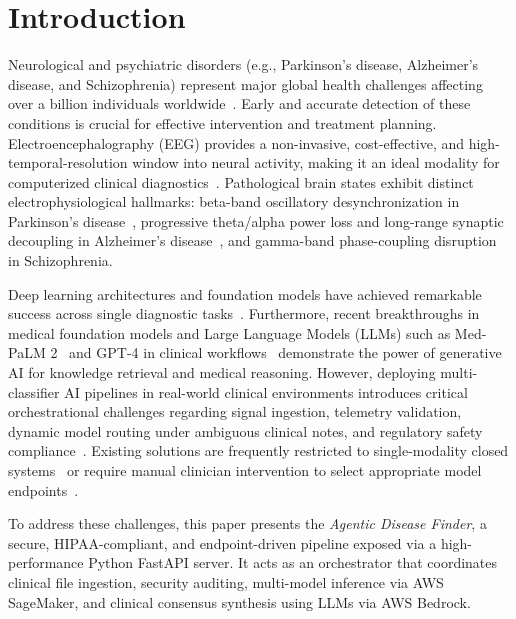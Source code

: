 \documentclass[runningheads]{llncs}
\begin{document}
\section{Introduction}
Neurological and psychiatric disorders (e.g., Parkinson's disease, Alzheimer's disease, and Schizophrenia) represent major global health challenges affecting over a billion individuals worldwide~\cite{who,aan}. Early and accurate detection of these conditions is crucial for effective intervention and treatment planning. Electroencephalography (EEG) provides a non-invasive, cost-effective, and high-temporal-resolution window into neural activity, making it an ideal modality for computerized clinical diagnostics~\cite{craik2019deep,acharya2019eeg}. Pathological brain states exhibit distinct electrophysiological hallmarks: beta-band oscillatory desynchronization in Parkinson's disease~\cite{hammond2007pathological}, progressive theta/alpha power loss and long-range synaptic decoupling in Alzheimer's disease~\cite{song2023eegtransformer}, and gamma-band phase-coupling disruption in Schizophrenia.

Deep learning architectures and foundation models have achieved remarkable success across single diagnostic tasks~\cite{craik2019deep,roy2019chrononet}. Furthermore, recent breakthroughs in medical foundation models and Large Language Models (LLMs) such as Med-PaLM 2~\cite{singhal2023medpalm} and GPT-4 in clinical workflows~\cite{nori2023gpt4med} demonstrate the power of generative AI for knowledge retrieval and medical reasoning. However, deploying multi-classifier AI pipelines in real-world clinical environments introduces critical orchestrational challenges regarding signal ingestion, telemetry validation, dynamic model routing under ambiguous clinical notes, and regulatory safety compliance~\cite{rajpurkar2022ai,xiong2024benchmarking}. Existing solutions are frequently restricted to single-modality closed systems~\cite{ibm,deepmind} or require manual clinician intervention to select appropriate model endpoints~\cite{nvidia}.

To address these challenges, this paper presents the \textit{Agentic Disease Finder}, a secure, HIPAA-compliant, and endpoint-driven pipeline exposed via a high-performance Python FastAPI server. It acts as an orchestrator that coordinates clinical file ingestion, security auditing, multi-model inference via AWS SageMaker, and clinical consensus synthesis using LLMs via AWS Bedrock.
\end{document}
